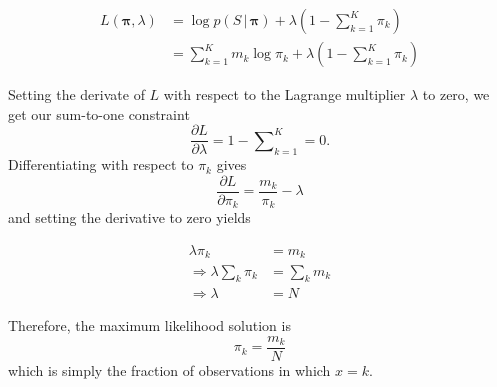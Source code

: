\documentclass[final,3p,times,twocolumn]{elsarticle}
\let\bs\boldsymbol
\begin{document}
\begin{equation}
\label{eqn:catlagrange}
\begin{split}
L(\bs \pi, \lambda) &= \log p(S\,|\,\bs \pi) + \lambda\left(1 - \sum \nolimits_{k=1}^K \pi_k\right)\\
&= \sum\nolimits_{k=1}^K m_k \log \pi_k + \lambda\left(1-\sum\nolimits_{k=1}^K \pi_k\right)
\end{split}
\end{equation}

Setting the derivate of $L$ with respect to the Lagrange multiplier $\lambda$ to zero, we get our sum-to-one constraint
\begin{equation}
\label{dldlambda}
\frac{\partial L}{\partial \lambda} = 1 - \sum\nolimits_{k=1}^K = 0.
\end{equation}
Differentiating with respect to $\pi_k$ gives
\begin{equation}
\frac{\partial L}{\partial \pi_k} = \frac{m_k}{\pi_k} - \lambda
\end{equation}
and setting the derivative to zero yields

\begin{equation}
\label{dldpi}
\begin{split}
\lambda \pi_k &= m_k\\
\Rightarrow \lambda \sum\nolimits_k \pi_k &= \sum\nolimits_k m_k\\
\Rightarrow \lambda &= N
\end{split}
\end{equation}

Therefore, the maximum likelihood solution is 
\begin{equation}
\label{eqn:catML}
\pi_k = \frac{m_k}{N}
\end{equation}
which is simply the fraction of observations in which $x = k$.
\end{document}

